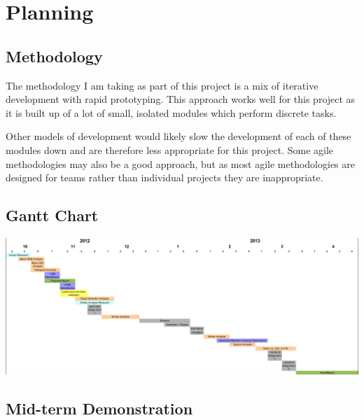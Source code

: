 \documentclass[11pt,fleqn,twoside]{article}
\begin{document}
\section{Planning}

\subsection{Methodology}
The methodology I am taking as part of this project is a mix of iterative development with rapid
prototyping. This approach works well for this project as it is built up of a lot of small, 
isolated modules which perform discrete tasks.

Other models of development would likely slow the development of each of these modules down and are
therefore less appropriate for this project. Some agile methodologies may also be a good approach,
but as most agile methodologies are designed for teams rather than individual projects they are
inappropriate.

\newpage
\subsection{Gantt Chart}
\includegraphics[scale=0.45, angle=90]{img/gantt.png}

\subsection{Mid-term Demonstration}

%

\end{document}
